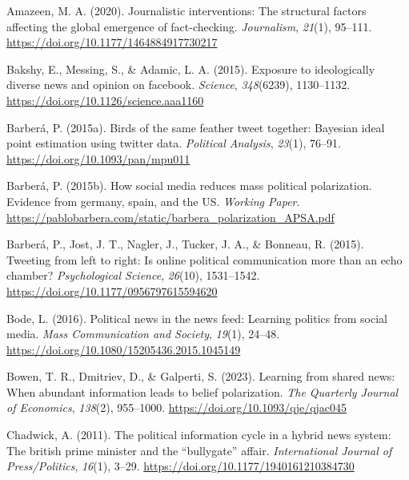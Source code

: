 \documentclass[
  12pt,
]{article}
\newlength{\cslhangindent}
\newlength{\cslentryspacingunit} %
\newenvironment{CSLReferences}[2] %
 {%
  \setlength{\parindent}{0pt}
  \ifodd #1
  \let\oldpar\par
  \def\par{\hangindent=\cslhangindent\oldpar}
  \fi
  \setlength{\parskip}{#2\cslentryspacingunit}
 }%
 {}
\begin{document}
\hypertarget{refs}{}
\begin{CSLReferences}{1}{0}
\leavevmode{}%
Amazeen, M. A. (2020). Journalistic interventions: The structural
factors affecting the global emergence of fact-checking.
\emph{Journalism}, \emph{21}(1), 95--111.
\url{https://doi.org/10.1177/1464884917730217}

\leavevmode{}%
Bakshy, E., Messing, S., \& Adamic, L. A. (2015). Exposure to
ideologically diverse news and opinion on facebook. \emph{Science},
\emph{348}(6239), 1130--1132.
\url{https://doi.org/10.1126/science.aaa1160}

\leavevmode{}%
Barberá, P. (2015a). Birds of the same feather tweet together: Bayesian
ideal point estimation using twitter data. \emph{Political Analysis},
\emph{23}(1), 76--91. \url{https://doi.org/10.1093/pan/mpu011}

\leavevmode{}%
Barberá, P. (2015b). How social media reduces mass political
polarization. Evidence from germany, spain, and the US. \emph{Working
Paper}.
\url{https://pablobarbera.com/static/barbera_polarization_APSA.pdf}

\leavevmode{}%
Barberá, P., Jost, J. T., Nagler, J., Tucker, J. A., \& Bonneau, R.
(2015). Tweeting from left to right: Is online political communication
more than an echo chamber? \emph{Psychological Science}, \emph{26}(10),
1531--1542. \url{https://doi.org/10.1177/0956797615594620}

\leavevmode{}%
Bode, L. (2016). Political news in the news feed: Learning politics from
social media. \emph{Mass Communication and Society}, \emph{19}(1),
24--48. \url{https://doi.org/10.1080/15205436.2015.1045149}

\leavevmode{}%
Bowen, T. R., Dmitriev, D., \& Galperti, S. (2023). Learning from shared
news: When abundant information leads to belief polarization. \emph{The
Quarterly Journal of Economics}, \emph{138}(2), 955--1000.
\url{https://doi.org/10.1093/qje/qjac045}

\leavevmode{}%
Chadwick, A. (2011). The political information cycle in a hybrid news
system: The british prime minister and the {``bullygate''} affair.
\emph{International Journal of Press/Politics}, \emph{16}(1), 3--29.
\url{https://doi.org/10.1177/1940161210384730}


\end{CSLReferences}
\end{document}
